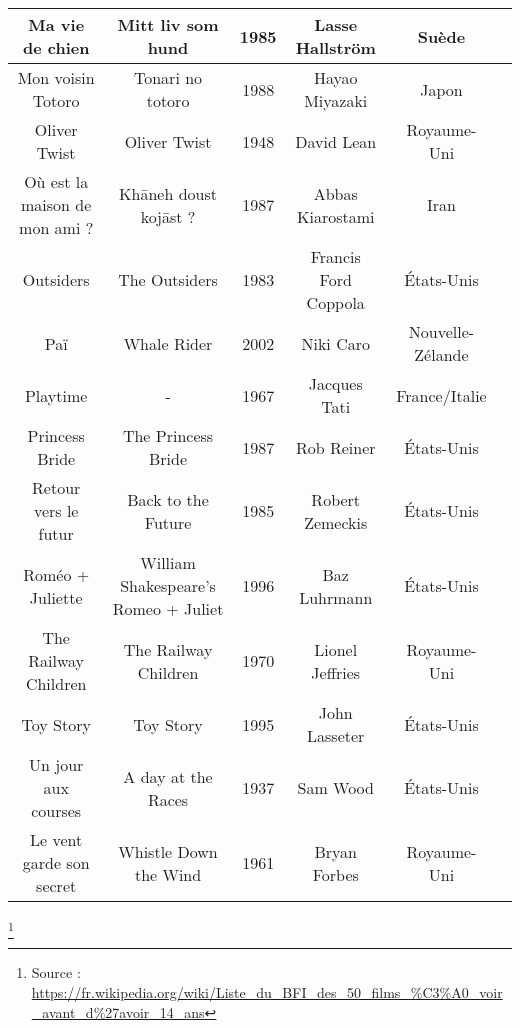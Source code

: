 \documentclass[a4paper]{article}
\begin{document}
\begin{tabular}{|c|c|c|c|c|c|}
\hline 
Ma vie de chien & Mitt liv som hund & 1985 & Lasse Hallström & Suède &  \\ 
\hline 
Mon voisin Totoro & Tonari no totoro & 1988 & Hayao Miyazaki & Japon &  \\ 
\hline 
Oliver Twist & Oliver Twist & 1948 & David Lean & Royaume-Uni &  \\ 
\hline 
Où est la maison de mon ami ? & Khāneh doust kojāst ? & 1987 & Abbas Kiarostami & Iran &  \\ 
\hline 
Outsiders & The Outsiders & 1983 & Francis Ford Coppola & États-Unis &  \\ 
\hline 
Paï & Whale Rider & 2002 & Niki Caro & Nouvelle-Zélande &  \\ 
\hline 
Playtime & - & 1967 & Jacques Tati & France/Italie &  \\ 
\hline 
Princess Bride & The Princess Bride & 1987 & Rob Reiner & États-Unis &  \\ 
\hline 
Retour vers le futur & Back to the Future & 1985 & Robert Zemeckis & États-Unis &  \\ 
\hline 
Roméo + Juliette & William Shakespeare's Romeo + Juliet & 1996 & Baz Luhrmann & États-Unis &  \\ 
\hline 
The Railway Children & The Railway Children & 1970 & Lionel Jeffries & Royaume-Uni &  \\ 
\hline 
Toy Story & Toy Story & 1995 & John Lasseter & États-Unis &  \\ 
\hline 
Un jour aux courses & A day at the Races & 1937 & Sam Wood & États-Unis &  \\ 
\hline 
Le vent garde son secret & Whistle Down the Wind & 1961 & Bryan Forbes & Royaume-Uni &  \\ 
\hline 
\end{tabular}
\footnote{Source : \url{https://fr.wikipedia.org/wiki/Liste_du_BFI_des_50_films_\%C3\%A0_voir_avant_d\%27avoir_14_ans}}
\thispagestyle{empty}
\end{document}
